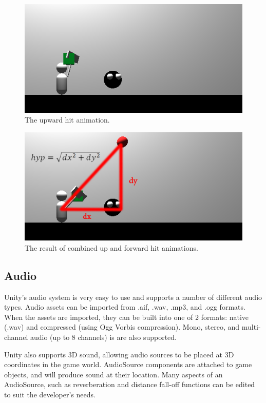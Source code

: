 \documentclass{article}
\begin{document}
\begin{figure}[h!]

\includegraphics[width=5in]{Graphics/upHit.png}
\caption{The upward hit animation.}
\label{UpHit}

\end{figure}

\begin{figure}[h!]

\includegraphics[width=5in]{Graphics/hitDiag.png}
\caption{The result of combined up and forward hit animations.}
\label{DiagHit}

\end{figure}

\subsection{Audio}

Unity's audio system is very easy to use and supports a number of different audio types.  Audio assets can be imported from .aif, .wav, .mp3, and .ogg formats.  When the assets are imported, they can be built into one of 2 formats: native (.wav) and compressed (using Ogg Vorbis compression).  Mono, stereo, and multi-channel audio (up to 8 channels) is are also supported.

Unity also supports 3D sound, allowing audio sources to be placed at 3D coordinates in the game world.  AudioSource components are attached to game objects, and will produce sound at their location.  Many aspects of an AudioSource, such as reverberation and distance fall-off functions can be edited to suit the developer's needs.
\end{document}
